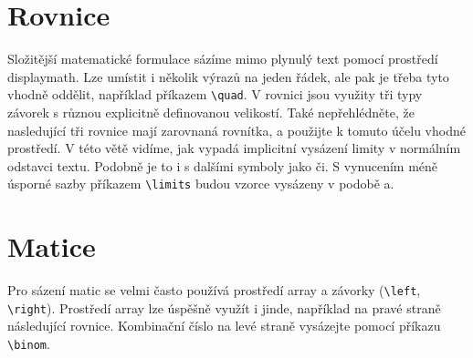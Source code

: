 \documentclass[a4paper,twocolumn,11pt]{article}[06-03-2022]
\begin{document}
\section{Rovnice}
Složitější matematické formulace sázíme mimo plynulý text pomocí prostředí displaymath. Lze umístit i několik výrazů na jeden řádek, ale pak je třeba tyto vhodně oddělit, například příkazem \verb|\quad|. V rovnici jsou využity tři typy závorek s různou explicitně definovanou velikostí. Také nepřehlédněte, že nasledující tři rovnice mají zarovnaná rovnítka, a použijte k tomuto účelu vhodné prostředí. V této větě vidíme, jak vypadá implicitní vysázení limity v normálním odstavci textu. Podobně je to i s dalšími symboly jako či. S vynucením méně úsporné sazby příkazem \verb|\limits| budou vzorce vysázeny v podobě a.

\section{Matice}
Pro sázení matic se velmi často používá prostředí array a závorky (\verb|\left|, \verb|\right|). Prostředí array lze úspěšně využít i jinde, například na pravé straně následující rovnice. Kombinační číslo na levé straně vysázejte pomocí příkazu \verb|\binom|.
\end{document}

